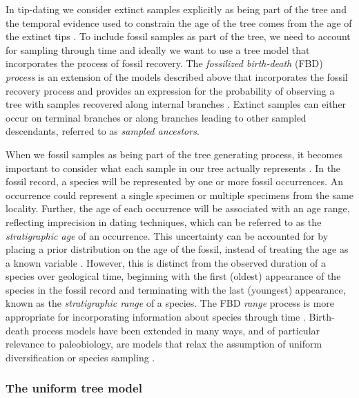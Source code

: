 In tip-dating we consider extinct samples explicitly as being part of the tree and the temporal evidence used to constrain the age of the tree comes from the age of the extinct tips \citep{Ronquist2012a}.
To include fossil samples as part of the tree, we need to account for sampling through time and ideally we want to use a tree model that incorporates the process of fossil recovery.
The \textit{fossilized birth-death} (FBD) \textit{process} is an extension of the models described above that incorporates the fossil recovery process and provides an expression for the probability of observing a tree with samples recovered along internal branches \citep{Stadler2010,Heath2014,Gavryushkina2014}.
Extinct samples can either occur on terminal branches or along branches leading to other sampled descendants, referred to as \textit{sampled ancestors}.

When we  fossil samples as being part of the tree generating process, it becomes important to consider what each sample in our tree actually represents \citep{Hopkins2018}.
In the fossil record, a species will be represented by one or more fossil occurrences.
An occurrence could represent a single specimen or multiple specimens from the same locality.
Further, the age of each occurrence will be associated with an age range, reflecting imprecision in dating techniques, which can be referred to as the \textit{stratigraphic age} of an occurrence.
This uncertainty can be accounted for by placing a prior distribution on the age of the fossil, instead of treating the age as a known variable \citep{Drummond2016,BaridoSottani2019a}.
However, this is distinct from the observed duration of a species over geological time, beginning with the first (oldest) appearance of the species in the fossil record and terminating with the last (youngest) appearance, known as the \textit{stratigraphic range} of a species.
The FBD \textit{range} process is more appropriate for incorporating information about species through time \citep{Stadler2018}.
Birth-death process models have been extended in many ways, and of particular relevance to paleobiology,  are models that relax the assumption of uniform diversification or species sampling \citep{Hoehna2011,Stadler2013b,Gavryushkina2014,Zhang2016,Kuehnert2016,BaridoSottani2018}.

\subsubsection{The uniform tree model}

